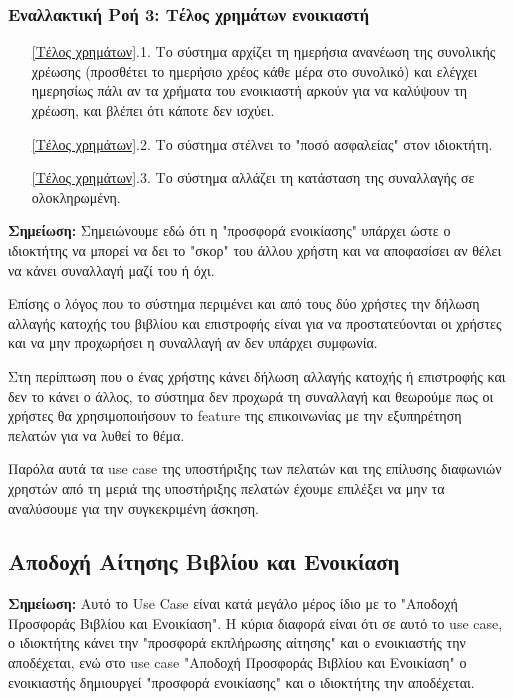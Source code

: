 \documentclass[12pt,a4paper]{article}
\begin{document}
\subsubsection*{Εναλλακτική Ροή 3: Τέλος χρημάτων ενοικιαστή}
\begin{enumerate}
    \item[\ref{Τέλος χρημάτων}.1.] Το σύστημα αρχίζει τη ημερήσια ανανέωση της συνολικής χρέωσης (προσθέτει το ημερήσιο χρέος κάθε μέρα στο συνολικό) και ελέγχει ημερησίως πάλι αν τα χρήματα του ενοικιαστή αρκούν για να καλύψουν τη χρέωση, και βλέπει ότι κάποτε δεν ισχύει.
    \item[\ref{Τέλος χρημάτων}.2.] Το σύστημα στέλνει το "ποσό ασφαλείας" στον ιδιοκτήτη.
    \item[\ref{Τέλος χρημάτων}.3.] Το σύστημα αλλάζει τη κατάσταση της συναλλαγής σε ολοκληρωμένη.
\end{enumerate}

\textbf{Σημείωση:} Σημειώνουμε εδώ ότι η "προσφορά ενοικίασης" υπάρχει ώστε ο ιδιοκτήτης να μπορεί να δει το "σκορ" του άλλου χρήστη και να αποφασίσει αν θέλει να κάνει συναλλαγή μαζί του ή όχι.

Επίσης ο λόγος που το σύστημα περιμένει και από τους δύο χρήστες την δήλωση αλλαγής κατοχής του βιβλίου και επιστροφής είναι για να προστατεύονται οι χρήστες και να μην προχωρήσει η συναλλαγή αν δεν υπάρχει συμφωνία.

Στη περίπτωση που ο ένας χρήστης κάνει δήλωση αλλαγής κατοχής ή επιστροφής και δεν το κάνει ο άλλος, το σύστημα δεν προχωρά τη συναλλαγή και θεωρούμε πως οι χρήστες θα χρησιμοποιήσουν το feature της επικοινωνίας με την εξυπηρέτηση πελατών για να λυθεί το θέμα.

Παρόλα αυτά τα use case της υποστήριξης των πελατών και της επίλυσης διαφωνιών χρηστών από τη μεριά της υποστήριξης πελατών έχουμε επιλέξει να μην τα αναλύσουμε για την συγκεκριμένη άσκηση.


\subsection{Αποδοχή Αίτησης Βιβλίου και Ενοικίαση}

\textbf{Σημείωση:} Αυτό το Use Case είναι κατά μεγάλο μέρος ίδιο με το "Αποδοχή Προσφοράς Βιβλίου και Ενοικίαση". Η κύρια διαφορά είναι ότι σε αυτό το use case, ο ιδιοκτήτης κάνει την "προσφορά εκπλήρωσης αίτησης" και ο ενοικιαστής την αποδέχεται, ενώ στο use case "Αποδοχή Προσφοράς Βιβλίου και Ενοικίαση" ο ενοικιαστής δημιουργεί "προσφορά ενοικίασης" και ο ιδιοκτήτης την αποδέχεται.
\end{document}
